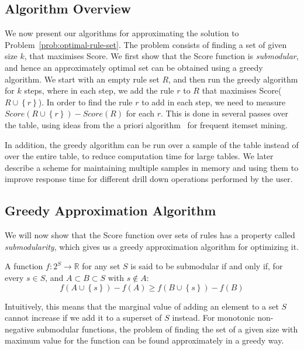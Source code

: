 \subsection{Algorithm Overview}\label{sec:alg-overview}
We now present our algorithms for approximating the solution to Problem~\ref{prob:optimal-rule-set}. The problem consists of finding a set of given size $k$, that maximises Score. We first show that the Score function is {\em submodular}, and hence an approximately optimal set can be obtained using a greedy algorithm. We start with an empty rule set $R$, and then run the greedy algorithm for $k$ steps, where in each step, we add the rule $r$ to $R$ that maximises Score($R \cup \left\lbrace r \right\rbrace$). In order to find the rule $r$ to add in each step, we need to measure $Score(R \cup \left\lbrace r \right\rbrace) - Score(R)$ for each $r$. This is done in several passes over the table, using ideas from the a priori algorithm~\cite{apriori} for frequent itemset mining. 

In addition, the greedy algorithm can be run over a sample of the table instead of over the entire table, to reduce computation time for large tables. We later describe a scheme for maintaining multiple samples in memory and using them to improve response time for different drill down operations performed by the user. 

\subsection{Greedy Approximation Algorithm}\label{sec:greedy-approx}
We will now show that the Score function over sets of rules has a property called {\em submodularity}, which gives us a greedy approximation algorithm for optimizing it. 
\begin{definition}
A function $f: 2^S \rightarrow \mathbb{R}$ for any set $S$ is said to be submodular if and only if, for every $s \in S$, and $A \subset B \subset S$ with $s \notin A$:
$$f(A \cup \left\lbrace s \right\rbrace) - f(A) \geq f(B \cup \left\lbrace s \right\rbrace) - f(B)$$
\end{definition}
Intuitively, this means that the marginal value of adding an element to a set $S$ cannot increase if we add it to a superset of $S$ instead. For monotonic non-negative submodular functions, the problem of finding the set of a given size with maximum value for the function can be found approximately in a greedy way. 

